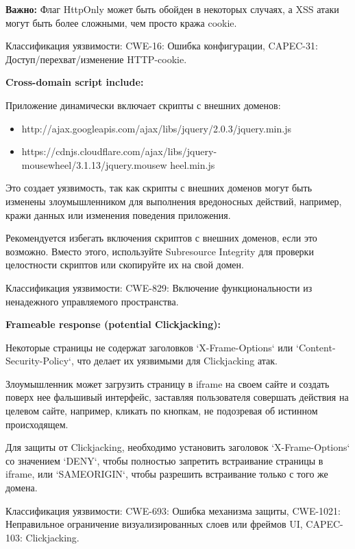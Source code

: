 \documentclass[a4paper,12pt]{diplom}
\begin{document}
	 \textbf{Важно:} Флаг HttpOnly может быть обойден в некоторых случаях, а XSS атаки могут быть более сложными, чем просто кража cookie. 
	 
	 Классификация уязвимости: CWE-16:  Ошибка конфигурации, CAPEC-31:  Доступ/перехват/изменение HTTP-cookie.
	 
	 
	 \medskip\medskip
	 
	 
	 \textbf{Cross-domain script include:}
	 
	 Приложение динамически включает скрипты с внешних доменов: 
	  \begin{itemize}
	 	\item http://ajax.googleapis.com/ajax/libs/jquery/2.0.3/jquery.min.js
	 	\item https://cdnjs.cloudflare.com/ajax/libs/jquery-mousewheel/3.1.13/jquery.mousew heel.min.js
	 \end{itemize}
	 
	 Это создает уязвимость, так как скрипты с внешних доменов могут быть изменены злоумышленником для выполнения вредоносных действий, например, кражи данных или изменения поведения приложения. 
	 
	 Рекомендуется избегать включения скриптов с внешних доменов, если это возможно. Вместо этого, используйте Subresource Integrity для проверки целостности скриптов или скопируйте их на свой домен. 
	 
	 Классификация уязвимости: CWE-829:  Включение функциональности из ненадежного управляемого пространства.
	 
	 
	 \medskip\medskip
	 
	 
	 \textbf{Frameable response (potential Clickjacking):}
	 
	 Некоторые страницы не содержат заголовков `X-Frame-Options` или `Content-Security-Policy`, что делает их уязвимыми для Clickjacking атак. 
	 
	 Злоумышленник может загрузить страницу в iframe на своем сайте и создать поверх нее фальшивый интерфейс, заставляя пользователя совершать действия на целевом сайте, например, кликать по кнопкам, не подозревая об истинном происходящем.
	 
	 Для защиты от Clickjacking, необходимо установить заголовок `X-Frame-Options` со значением `DENY`, чтобы полностью запретить встраивание страницы в iframe, или `SAMEORIGIN`, чтобы разрешить встраивание только с того же домена.
	 
	 Классификация уязвимости: CWE-693:  Ошибка механизма защиты,  CWE-1021:  Неправильное ограничение визуализированных слоев или фреймов UI, CAPEC-103:  Clickjacking. 
	 
\end{document}
